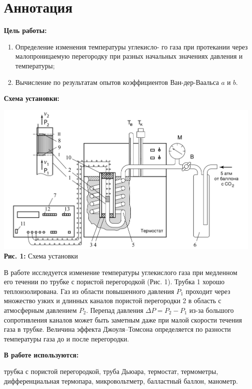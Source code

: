 \documentclass[12pt,a4paper]{scrartcl}
\begin{document}
	\section{Аннотация}
	
	\textbf{Цель работы: }
	
	\begin{enumerate}
		\item Определение изменения температуры углекисло-
		го газа при протекании через малопроницаемую перегородку при
		разных начальных значениях давления и температуры;
		\item Вычисление по результатам опытов коэффициентов Ван-дер-Ваальса $a$ и
		$b$.
	\end{enumerate}
	
	\textbf{Схема установки:}
	\begin{center}
		\includegraphics[scale=0.2]{PIC_1}
		\\\textbf{Рис. 1:} Схема установки
	\end{center}
		
	В работе исследуется изменение температуры углекислого газа	при медленном его течении по трубке с пористой перегородкой (Рис. 1). Трубка 1 хорошо теплоизолирована. Газ из области повышенного давления $P_1$ проходит через множество узких и длинных каналов пористой перегородки 2 в область с атмосферным давлением $P_2$. Перепад давления $\Delta P = P_2 - P_1$ из-за большого сопротивления каналов может быть заметным даже при малой скорости течения газа в трубке. Величина эффекта Джоуля–Томсона определяется по
	разности температуры газа до и после перегородки.	
		
	\textbf{В работе используются:}
	
	трубка с пористой перегородкой, труба Дьюара, термостат, термометры, дифференциальная термопара, микровольтметр, балластный баллон, манометр.
	
\end{document}
